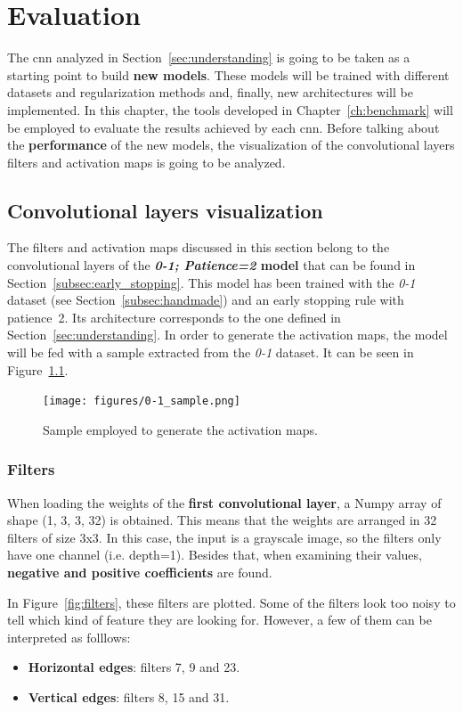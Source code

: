 \chapter{Evaluation}\label{sec:new_models}
The \gls{cnn} analyzed in Section~\ref{sec:understanding} is going to be taken as a starting point to build \textbf{new models}. These models will be trained with different datasets and regularization methods and, finally, new architectures will be implemented. In this chapter, the tools developed in Chapter~\ref{ch:benchmark} will be employed to evaluate the results achieved by each \gls{cnn}. Before talking about the \textbf{performance} of the new models, the visualization of the convolutional layers filters and activation maps is going to be analyzed.

\section{Convolutional layers visualization}
The filters and activation maps discussed in this section belong to the convolutional layers of the \textbf{\textit{0-1; Patience=2} model} that can be found in Section~\ref{subsec:early_stopping}. This model has been trained with the \textit{0-1} dataset (see Section~\ref{subsec:handmade}) and an early stopping rule with patience~2. Its architecture corresponds to the one defined in Section~\ref{sec:understanding}. In order to generate the activation maps, the model will be fed with a sample extracted from the \textit{0-1} dataset. It can be seen in Figure~\ref{fig:sample}.
\begin{figure}
	\centering
	\texttt{[image: figures/0-1\_sample.png]}
	\caption{Sample employed to generate the activation maps.}
	\label{fig:sample}
\end{figure}

\subsection{Filters}
When loading the weights of the \textbf{first convolutional layer}, a Numpy array of shape (1, 3, 3, 32) is obtained. This means that the weights are arranged in 32 filters of size 3x3. In this case, the input is a grayscale image, so the filters only have one channel (i.e. depth=1). Besides that, when examining their values, \textbf{negative and positive coefficients} are found.

In Figure~\ref{fig:filters}, these filters are plotted. Some of the filters look too noisy to tell which kind of feature they are looking for. However, a few of them can be interpreted as folllows:
\begin{itemize}
	\item \textbf{Horizontal edges}: filters 7, 9 and 23.
	\item \textbf{Vertical edges}: filters 8, 15 and 31.	
\end{itemize}

